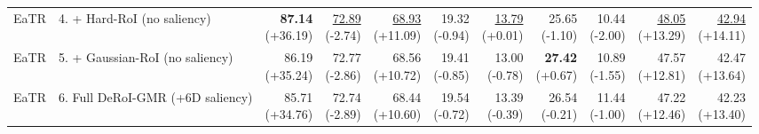 \documentclass{article}
\begin{document}
{\begin{tabular}{llrrrrrrrrr}
EaTR & 4. + Hard-RoI (no saliency) & \shortstack{\textbf{87.14} \\ {\scriptsize (+36.19)}} & \shortstack{\underline{72.89} \\ {\scriptsize (-2.74)}} & \shortstack{\underline{68.93} \\ {\scriptsize (+11.09)}} & \shortstack{19.32 \\ {\scriptsize (-0.94)}} & \shortstack{\underline{13.79} \\ {\scriptsize (+0.01)}} & \shortstack{25.65 \\ {\scriptsize (-1.10)}} & \shortstack{10.44 \\ {\scriptsize (-2.00)}} & \shortstack{\underline{48.05} \\ {\scriptsize (+13.29)}} & \shortstack{\underline{42.94} \\ {\scriptsize (+14.11)}} \\
EaTR & 5. + Gaussian-RoI (no saliency) & \shortstack{86.19 \\ {\scriptsize (+35.24)}} & \shortstack{72.77 \\ {\scriptsize (-2.86)}} & \shortstack{68.56 \\ {\scriptsize (+10.72)}} & \shortstack{19.41 \\ {\scriptsize (-0.85)}} & \shortstack{13.00 \\ {\scriptsize (-0.78)}} & \shortstack{\textbf{27.42} \\ {\scriptsize (+0.67)}} & \shortstack{10.89 \\ {\scriptsize (-1.55)}} & \shortstack{47.57 \\ {\scriptsize (+12.81)}} & \shortstack{42.47 \\ {\scriptsize (+13.64)}} \\
EaTR & 6. Full DeRoI-GMR (+6D saliency) & \shortstack{85.71 \\ {\scriptsize (+34.76)}} & \shortstack{72.74 \\ {\scriptsize (-2.89)}} & \shortstack{68.44 \\ {\scriptsize (+10.60)}} & \shortstack{19.54 \\ {\scriptsize (-0.72)}} & \shortstack{13.39 \\ {\scriptsize (-0.39)}} & \shortstack{26.54 \\ {\scriptsize (-0.21)}} & \shortstack{11.44 \\ {\scriptsize (-1.00)}} & \shortstack{47.22 \\ {\scriptsize (+12.46)}} & \shortstack{42.23 \\ {\scriptsize (+13.40)}} \\

\end{tabular}}
\end{document}
